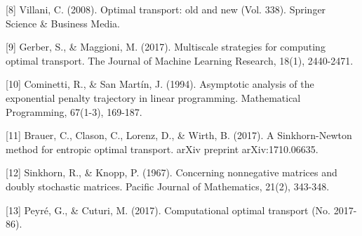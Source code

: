 \documentclass{article}
\begin{document}
 [8] Villani, C. (2008). Optimal transport: old and new (Vol. 338). Springer Science \& Business Media.
 
 [9] Gerber, S., \& Maggioni, M. (2017). Multiscale strategies for computing optimal transport. The Journal of Machine Learning Research, 18(1), 2440-2471.
 
 [10] Cominetti, R., \& San Martín, J. (1994). Asymptotic analysis of the exponential penalty trajectory in linear programming. Mathematical Programming, 67(1-3), 169-187.
 
 [11] Brauer, C., Clason, C., Lorenz, D., \& Wirth, B. (2017). A Sinkhorn-Newton method for entropic optimal transport. arXiv preprint arXiv:1710.06635.
 
 [12] Sinkhorn, R., \& Knopp, P. (1967). Concerning nonnegative matrices and doubly stochastic matrices. Pacific Journal of Mathematics, 21(2), 343-348.
 
 [13] Peyré, G., \& Cuturi, M. (2017). Computational optimal transport (No. 2017-86).
\end{document}

